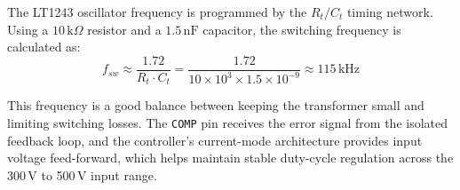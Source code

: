 The LT1243 oscillator frequency is programmed by the $R_t/C_t$ timing network. Using a $10\,\text{k}\Omega$ resistor and a $1.5\,\text{nF}$ capacitor, the switching frequency is calculated as:
\begin{equation}
f_{sw} \approx \frac{1.72}{R_t \cdot C_t} = \frac{1.72}{10\times10^3 \times 1.5\times10^{-9}} \approx 115\,\text{kHz}
\end{equation}

This frequency is a good balance between keeping the transformer small and limiting switching losses. The \texttt{COMP} pin receives the error signal from the isolated feedback loop, and the controller's current-mode architecture provides input voltage feed-forward, which helps maintain stable duty-cycle regulation across the 300\,V to 500\,V input range.